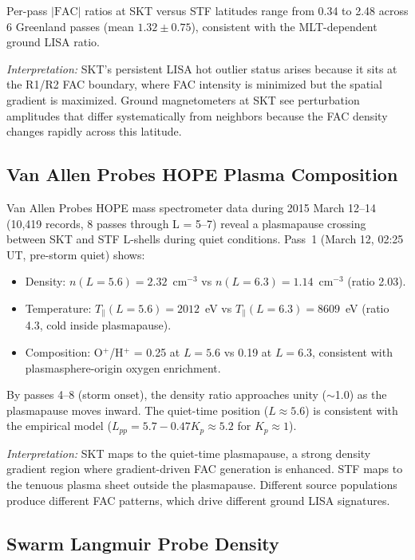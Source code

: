 \documentclass[11pt,letterpaper]{article}
\begin{document}
Per-pass $|\mathrm{FAC}|$ ratios at SKT versus STF latitudes range from 0.34 to
2.48 across 6 Greenland passes (mean $1.32 \pm 0.75$), consistent with the
MLT-dependent ground LISA ratio.

\textit{Interpretation:} SKT's persistent LISA hot outlier status arises because
it sits at the R1/R2 FAC boundary, where FAC intensity is minimized but the
spatial gradient is maximized. Ground magnetometers at SKT see perturbation
amplitudes that differ systematically from neighbors because the FAC density
changes rapidly across this latitude.

\subsection{Van Allen Probes HOPE Plasma Composition}
\label{sec:rbsp}

Van Allen Probes HOPE mass spectrometer data \citep{funsten2013helium}
during 2015 March 12--14 (10,419 records, 8 passes through L = 5--7)
reveal a plasmapause crossing between SKT and STF L-shells during quiet
conditions. Pass~1 (March 12, 02:25 UT, pre-storm quiet) shows:
\begin{itemize}
\item Density: $n(L = 5.6) = 2.32$~cm$^{-3}$ vs $n(L = 6.3) = 1.14$~cm$^{-3}$
  (ratio 2.03).
\item Temperature: $T_\parallel(L = 5.6) = 2012$~eV vs $T_\parallel(L = 6.3) =
  8609$~eV (ratio 4.3, cold inside plasmapause).
\item Composition: O$^+$/H$^+$ = 0.25 at $L = 5.6$ vs 0.19 at $L = 6.3$,
  consistent with plasmasphere-origin oxygen enrichment.
\end{itemize}
By passes 4--8 (storm onset), the density ratio approaches unity ($\sim$1.0) as
the plasmapause moves inward. The quiet-time position ($L \approx 5.6$) is
consistent with the \citet{carpenter1992plasmapause} empirical model
($L_{pp} = 5.7 - 0.47 K_p \approx 5.2$ for $K_p \approx 1$).

\textit{Interpretation:} SKT maps to the quiet-time plasmapause, a strong
density gradient region where gradient-driven FAC generation is enhanced. STF
maps to the tenuous plasma sheet outside the plasmapause. Different source
populations produce different FAC patterns, which drive different ground LISA
signatures.

\subsection{Swarm Langmuir Probe Density}
\label{sec:efi}
\end{document}
